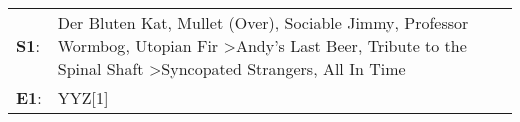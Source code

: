 \begin{supertabular}{p{0.03\textwidth}p{0.92\textwidth}}
 \textbf{S1}:  &  Der Bluten Kat\textsuperscript{}, \enspace Mullet (Over)\textsuperscript{}, \enspace Sociable Jimmy\textsuperscript{}, \enspace Professor Wormbog\textsuperscript{}, \enspace Utopian Fir\textsuperscript{} \textgreater \enspace Andy's Last Beer\textsuperscript{}, \enspace Tribute to the Spinal Shaft\textsuperscript{} \textgreater \enspace Syncopated Strangers\textsuperscript{}, \enspace All In Time\textsuperscript{}  \enspace  \\
 \textbf{E1}:  &                                                                                                                                                                                                                                                                                                                                                                                                           YYZ[1]\textsuperscript{}  \enspace  \\
\end{supertabular}
